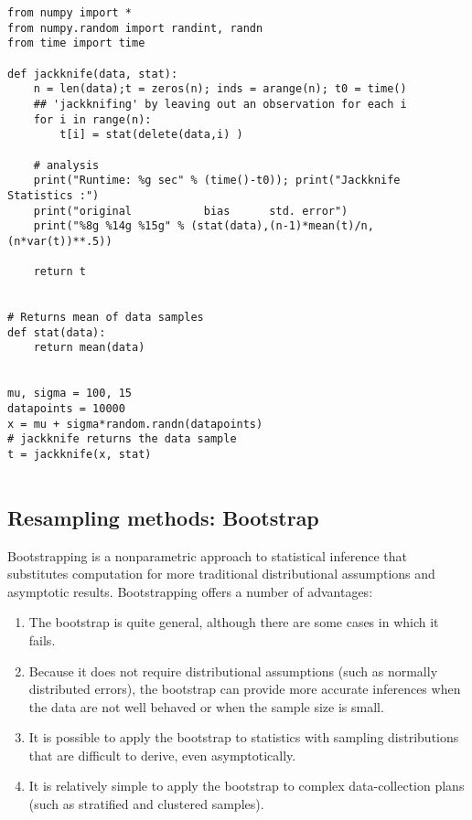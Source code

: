 \documentclass[%
oneside,                 %
final,                   %
10pt]{article}
\begin{document}
\begin{verbatim}
from numpy import *
from numpy.random import randint, randn
from time import time

def jackknife(data, stat):
    n = len(data);t = zeros(n); inds = arange(n); t0 = time()
    ## 'jackknifing' by leaving out an observation for each i                                                                                                                      
    for i in range(n):
        t[i] = stat(delete(data,i) )

    # analysis                                                                                                                                                                     
    print("Runtime: %g sec" % (time()-t0)); print("Jackknife Statistics :")
    print("original           bias      std. error")
    print("%8g %14g %15g" % (stat(data),(n-1)*mean(t)/n, (n*var(t))**.5))

    return t


# Returns mean of data samples                                                                                                                                                     
def stat(data):
    return mean(data)


mu, sigma = 100, 15
datapoints = 10000
x = mu + sigma*random.randn(datapoints)
# jackknife returns the data sample                                                                                                                                                
t = jackknife(x, stat)


\end{verbatim}


\subsection*{Resampling methods: Bootstrap}

Bootstrapping is a nonparametric approach to statistical inference
that substitutes computation for more traditional distributional
assumptions and asymptotic results. Bootstrapping offers a number of
advantages: 
\begin{enumerate}
\item The bootstrap is quite general, although there are some cases in which it fails.  

\item Because it does not require distributional assumptions (such as normally distributed errors), the bootstrap can provide more accurate inferences when the data are not well behaved or when the sample size is small.  

\item It is possible to apply the bootstrap to statistics with sampling distributions that are difficult to derive, even asymptotically. 

\item It is relatively simple to apply the bootstrap to complex data-collection plans (such as stratified and clustered samples).
\end{enumerate}
\end{document}
